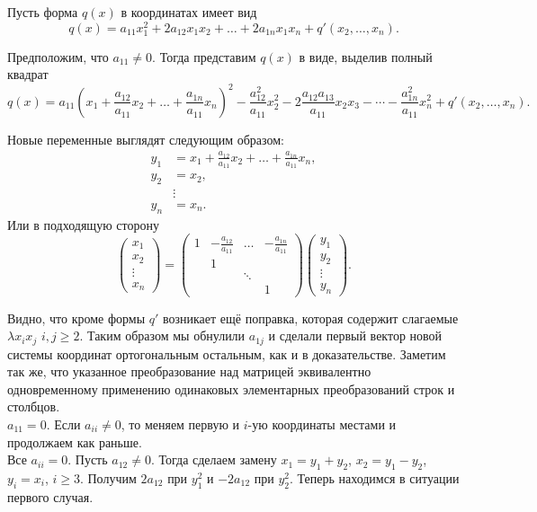 \documentclass[10pt,a4paper,oneside]{book} %
\theoremstyle{definition}
\def\pmat{\begin{pmatrix}}
\def\epmat{\end{pmatrix}}
\begin{document}
Пусть форма $q(x)$ в координатах имеет вид
$$q(x)= a_{11}x_1^2+ 2a_{12}x_1x_2 + \dots + 2a_{1n}x_1x_n  + q'(x_2, \dots, x_n).$$

 Предположим, что $a_{11}\neq 0$. Тогда представим $q(x)$ в виде, выделив полный квадрат 
$$q(x)= a_{11}\left(x_1+\frac{a_{12}}{a_{11}}x_2 + \dots +\frac{a_{1n}}{a_{11}}x_n\right)^2 - \frac{a_{12}^2}{a_{11}}x_2^2 - 2\frac{a_{12}a_{13}}{a_{11}}x_2x_3 - \cdots - \frac{a_{1n}^2}{a_{11}}x_n^2 + q'(x_2,\dots,x_n).$$

Новые переменные выглядят следующим образом:
\begin{align*}
y_1&=x_1+\frac{a_{12}}{a_{11}}x_2 + \dots +\frac{a_{1n}}{a_{11}}x_n,\\
 y_2&=x_2, \\
&\vdots\\
 y_n&=x_n.
\end{align*}
Или в подходящую сторону
$$ \pmat x_1 \\ x_2 \\ \vdots \\ x_n \epmat = \pmat 1 & -\frac{a_{12}}{a_{11}} & \dots & -\frac{a_{1n}}{a_{11}} \\
& 1 && \\
& & \ddots & \\
&&& 1
\epmat \pmat y_1 \\ y_2 \\ \vdots \\ y_n \epmat.
$$

Видно, что кроме формы $q'$ возникает ещё поправка, которая содержит слагаемые $\lambda x_ix_j$ $i,j\geq 2$. Таким образом мы обнулили $a_{1j}$ и сделали первый вектор новой системы координат ортогональным остальным, как и в доказательстве. Заметим так же, что указанное преобразование над матрицей эквивалентно одновременному применению одинаковых элементарных преобразований строк и столбцов.\\




 $a_{11}=0$. Если $a_{ii}\neq 0$, то меняем первую и $i$-ую координаты местами  и продолжаем как раньше. \\


 Все $a_{ii}=0$.
Пусть $a_{12}\neq 0$. Тогда сделаем замену $x_1=y_1+y_2$, $x_2=y_1-y_2$, $y_i=x_i$, $i\geq 3$. Получим $2a_{12}$ при $y_1^2$ и $-2a_{12}$ при $y_2^2$. Теперь находимся в ситуации первого случая.\\
\end{document}
